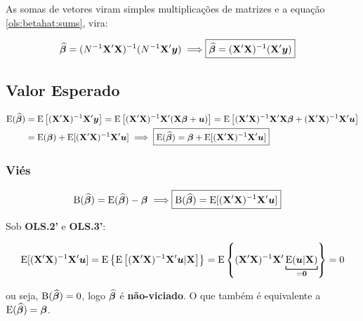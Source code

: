 \documentclass[11pt, oneside, a4paper, article]{article}
\numberwithin{equation}{section}
\begin{document}
As somas de vetores viram simples multiplicações de matrizes e a equação \eqref{ols:betahat:sums}, vira:

\vspace{-1 em}
\begin{align} 
	\label{ols:betahat:mat}
	\widehat{\betavec} = (N^{-1} \Xmat' \Xmat)^{-1} (N^{-1} \Xmat'\yvec)
	\implies
	\Aboxed{ \widehat{\betavec} = (\Xmat'\Xmat)^{-1}(\Xmat'\yvec)}
\end{align}

\subsection{Valor Esperado} 

\vspace{-2 em}
\begin{align*} 
	\text{E} ( \widehat{\boldsymbol{\beta}} ) 
	&= \text{E} \left[ (\mathbf{X}'\mathbf{X})^{-1}\mathbf{X}'\boldsymbol{y} \right]
	= \text{E} \left[ (\mathbf{X}'\mathbf{X})^{-1}\mathbf{X}'(\mathbf{X} \boldsymbol{\beta} + \boldsymbol{u}) \right]
	= \text{E} \left[ (\mathbf{X}'\mathbf{X})^{-1}\mathbf{X}'\mathbf{X} \boldsymbol{\beta} + (\mathbf{X}'\mathbf{X})^{-1}\mathbf{X}'\boldsymbol{u} \right]
	\\
	&= \text{E} (\boldsymbol{\beta}) + \text{E}[(\mathbf{X}'\mathbf{X})^{-1}\mathbf{X}'\boldsymbol{u} ]
	\implies
	\boxed{
		\text{E} ( \widehat{\boldsymbol{\beta}} ) 
	= \boldsymbol{\beta} + \text{E}[(\mathbf{X}'\mathbf{X})^{-1}\mathbf{X}'\boldsymbol{u} ] }
\end{align*}

\subsubsection{Viés} 

\vspace{-2 em}
\begin{align*} 
	\B( \widehat{\betavec} ) = \E ( \widehat{\betavec} ) - \betavec
	\implies
	\Aboxed{ \B( \widehat{\betavec} ) = \E[ (\Xmat'\Xmat)^{-1}\Xmat'\uvec ] }
\end{align*}

\begin{remark}
	Sob \textbf{OLS.2'} e \textbf{OLS.3'}:

	\vspace{-2 em}
	\begin{align*}
		\E[(\Xmat'\Xmat)^{-1}\Xmat'\uvec ]
		= \E \left\{ \E\left[ (\Xmat'\Xmat)^{-1}\Xmat'\uvec | \Xmat \right]  \right\}  
		= \E \left\{  (\Xmat'\Xmat)^{-1}\Xmat'
			\underbracket[.75pt]{\E( \uvec | \Xmat )}_{= \zerovec}
		\right\} = 0
	\end{align*}

	\noindent
	ou seja, 
	$\text{B}( \widehat{\boldsymbol{\beta}} ) = 0$, logo $\widehat{\boldsymbol{\beta}}$ é \textbf{não-viciado}.
	O que também é equivalente a  $\text{E}( \widehat{\boldsymbol{\beta}} ) = \boldsymbol{\beta}$.
\end{remark}
\end{document}
